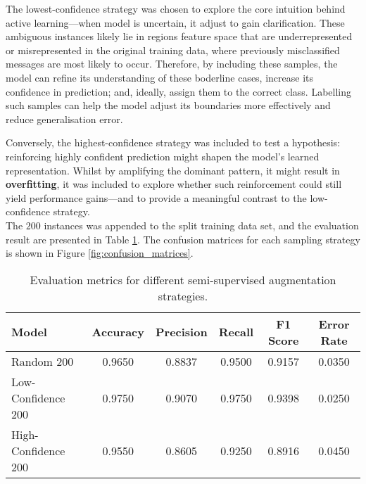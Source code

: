 \documentclass[a4paper,12pt]{article}
\begin{document}
The lowest-confidence strategy was chosen to explore the core intuition behind active learning—when model is uncertain, it adjust to gain clarification. These ambiguous instances likely lie in regions feature space that are underrepresented or misrepresented in the original training data, where previously misclassified messages are most likely to occur. Therefore, by including these samples, the model can refine its understanding of these boderline cases, increase its confidence in prediction; and, ideally, assign them to the correct class. Labelling such samples can help the model adjust its boundaries more effectively and reduce generalisation error.

Conversely, the highest-confidence strategy was included to test a hypothesis: reinforcing highly confident prediction might shapen the model's learned representation. Whilst by amplifying the dominant pattern, it might result in \textbf{overfitting}, it was included to explore whether such reinforcement could still yield performance gains—and to provide a meaningful contrast to the low-confidence strategy. \\

The $200$ instances was appended to the split training data set, and the evaluation result are presented in Table \ref{tab:evaluation-metrics}. The confusion matrices for each sampling strategy is shown in Figure \ref{fig:confusion_matrices}.

\begin{table}[h!]
\centering
\begin{tabular}{lccccc}
\hline
\textbf{Model} & \textbf{Accuracy} & \textbf{Precision} & \textbf{Recall} & \textbf{F1 Score} & \textbf{Error Rate} \\
\hline
Random 200         & 0.9650 & 0.8837 & 0.9500 & 0.9157 & 0.0350 \\
Low-Confidence 200 & 0.9750 & 0.9070 & 0.9750 & 0.9398 & 0.0250 \\
High-Confidence 200& 0.9550 & 0.8605 & 0.9250 & 0.8916 & 0.0450 \\
\hline
\end{tabular}
\caption{Evaluation metrics for different semi-supervised augmentation strategies.}
\label{tab:evaluation-metrics}
\end{table}
\end{document}
